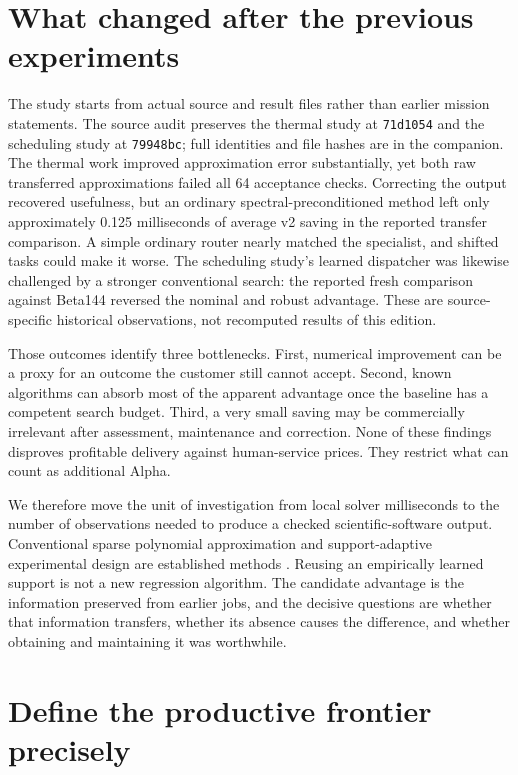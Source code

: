 \documentclass[11pt,letterpaper]{article}
\begin{document}
\section{What changed after the previous experiments}

The study starts from actual source and result files rather than earlier mission statements. The source audit preserves the thermal study at \texttt{71d1054} and the scheduling study at \texttt{79948bc}; full identities and file hashes are in the companion. The thermal work improved approximation error substantially, yet both raw transferred approximations failed all 64 acceptance checks. Correcting the output recovered usefulness, but an ordinary spectral-preconditioned method left only approximately 0.125 milliseconds of average v2 saving in the reported transfer comparison. A simple ordinary router nearly matched the specialist, and shifted tasks could make it worse. The scheduling study's learned dispatcher was likewise challenged by a stronger conventional search: the reported fresh comparison against Beta144 reversed the nominal and robust advantage. These are source-specific historical observations, not recomputed results of this edition.

Those outcomes identify three bottlenecks. First, numerical improvement can be a proxy for an outcome the customer still cannot accept. Second, known algorithms can absorb most of the apparent advantage once the baseline has a competent search budget. Third, a very small saving may be commercially irrelevant after assessment, maintenance and correction. None of these findings disproves profitable delivery against human-service prices. They restrict what can count as additional Alpha.

We therefore move the unit of investigation from local solver milliseconds to the number of observations needed to produce a checked scientific-software output. Conventional sparse polynomial approximation and support-adaptive experimental design are established methods \cite{diaz,tropp,ard}. Reusing an empirically learned support is not a new regression algorithm. The candidate advantage is the information preserved from earlier jobs, and the decisive questions are whether that information transfers, whether its absence causes the difference, and whether obtaining and maintaining it was worthwhile.

\section{Define the productive frontier precisely}
\end{document}
